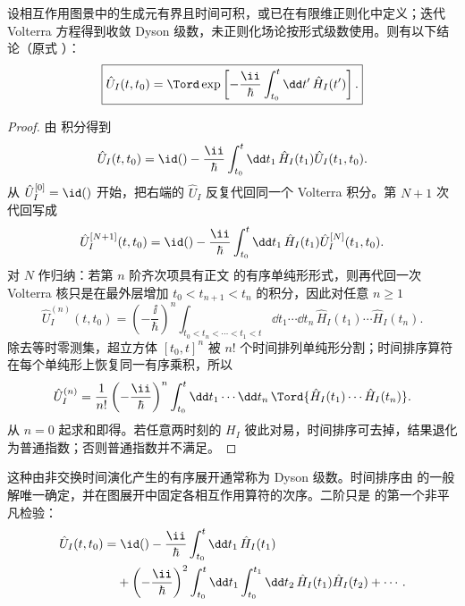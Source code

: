 \begin{proposition}
设相互作用图景中的生成元有界且时间可积，或已在有限维正则化中定义；迭代 Volterra 方程得到收敛 Dyson 级数，未正则化场论按形式级数使用。则有以下结论（原式 ）：
\begin{equation*}
 \boxed{
 \hat U_I(t,t_0)
 =\Tord\exp\left[-\frac{\ii}{\hbar}
 \int_{t_0}^{t}\dd t'\,\hat H_I(t')\right].}
 \end{equation*}
\end{proposition}
\begin{proof}
由 积分得到
\begin{equation*}
 \hat U_I(t,t_0)=\id()-\frac{\ii}{\hbar}
 \int_{t_0}^{t}\dd t_1\,\hat H_I(t_1)\hat U_I(t_1,t_0).
\end{equation*}
从 $\hat U_I^{[0]}=\id()$ 开始，把右端的 $\hat U_I$ 反复代回同一个 Volterra 积分。第 $N+1$ 次代回写成
\begin{equation*}
 \hat U_I^{[N+1]}(t,t_0)
 =\id()-\frac{\ii}{\hbar}\int_{t_0}^{t}\dd t_1\,
 \hat H_I(t_1)\hat U_I^{[N]}(t_1,t_0).
\end{equation*}
对 $N$ 作归纳：若第 $n$ 阶齐次项具有正文 的有序单纯形形式，则再代回一次 Volterra 核只是在最外层增加 $t_0<t_{n+1}<t_n$ 的积分，因此对任意 $n\ge1$
\begin{equation*}
 \hat U_I^{(n)}(t,t_0)
 =\left(-\frac{\ii}{\hbar}\right)^n
 \int_{t_0<t_n<\cdots<t_1<t}\dd t_1\cdots\dd t_n\,
 \hat H_I(t_1)\cdots\hat H_I(t_n).
\end{equation*}
除去等时零测集，超立方体 $[t_0,t]^n$ 被 $n!$ 个时间排列单纯形分割；时间排序算符在每个单纯形上恢复同一有序乘积，所以
\begin{equation*}
 \hat U_I^{(n)}
 =\frac1{n!}\left(-\frac{\ii}{\hbar}\right)^n
 \int_{t_0}^{t}\dd t_1\cdots\dd t_n\,
 \Tord\{\hat H_I(t_1)\cdots\hat H_I(t_n)\}.
\end{equation*}
从 $n=0$ 起求和即得。若任意两时刻的 $H_I$ 彼此对易，时间排序可去掉，结果退化为普通指数；否则普通指数并不满足。
\end{proof}

这种由非交换时间演化产生的有序展开通常称为 Dyson 级数。时间排序由 的一般解唯一确定，并在图展开中固定各相互作用算符的次序。二阶只是 的第一个非平凡检验：
\begin{align}
 \hat U_I(t,t_0)
 =&\;\id()-\frac{\ii}{\hbar}\int_{t_0}^{t}\dd t_1\,\hat H_I(t_1)\nonumber\\
 &+\left(-\frac{\ii}{\hbar}\right)^2
 \int_{t_0}^{t}\dd t_1\int_{t_0}^{t_1}\dd t_2\,
 \hat H_I(t_1)\hat H_I(t_2)+\cdots .
 \label{eq:dyson-ordered-domain-r2}
\end{align}

